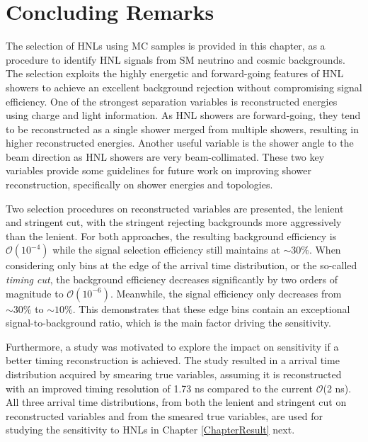\section{Concluding Remarks}
\label{sec:select_conclude}

The selection of HNLs using MC samples is provided in this chapter, as a procedure to identify HNL signals from SM neutrino and cosmic backgrounds.
The selection exploits the highly energetic and forward-going features of HNL showers to achieve an excellent background rejection without compromising signal efficiency.
One of the strongest separation variables is reconstructed energies using charge and light information.
As HNL showers are forward-going, they tend to be reconstructed as a single shower merged from multiple showers, resulting in higher reconstructed energies.
Another useful variable is the shower angle to the beam direction as HNL showers are very beam-collimated.
These two key variables provide some guidelines for future work on improving shower reconstruction, specifically on shower energies and topologies.

Two selection procedures on reconstructed variables are presented, the lenient and stringent cut, with the stringent rejecting backgrounds more aggressively than the lenient.
For both approaches, the resulting background efficiency is $\mathcal{O}(10^{-4})$ while the signal selection efficiency still maintains at $\sim30\%$. 
When considering only bins at the edge of the arrival time distribution, or the so-called \textit{timing cut}, the background efficiency decreases significantly by two orders of magnitude to $\mathcal{O}(10^{-6})$.
Meanwhile, the signal efficiency only decreases from $\sim30\%$ to $\sim10\%$. 
This demonstrates that these edge bins contain an exceptional signal-to-background ratio, which is the main factor driving the sensitivity.

Furthermore, a study was motivated to explore the impact on sensitivity if a better timing reconstruction is achieved.
The study resulted in a arrival time distribution acquired by smearing true variables, assuming it is reconstructed with an improved timing resolution of 1.73 ns compared to the current $\mathcal{O}$(2 ns).
All three arrival time distributions, from both the lenient and stringent cut on reconstructed variables and from the smeared true variables, are used for studying the sensitivity to HNLs in Chapter \ref{ChapterResult} next. 


